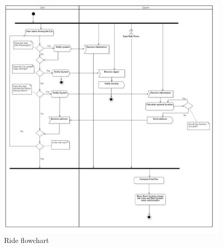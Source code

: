 \FloatBarrier
\begin{figure}[h]
\centering
\includegraphics[width=\linewidth,keepaspectratio]{../Diagrams/AD/Ride.png}
\caption{Ride flowchart}
\end{figure}
\FloatBarrier

